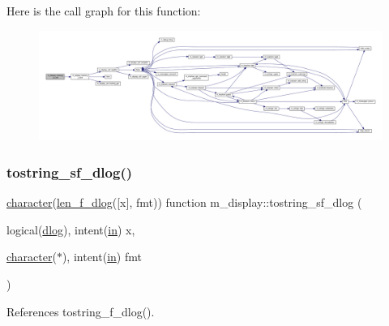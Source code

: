 Here is the call graph for this function\+:
\nopagebreak
\begin{figure}[H]
\begin{center}
\leavevmode
\includegraphics[width=350pt]{namespacem__display_aa7d1fb61fc22bddb9232eaa13aaaa43f_cgraph}
\end{center}
\end{figure}
\mbox{\label{namespacem__display_a833175a75a1f2563fb749394bc577196}} 
\subsubsection{\texorpdfstring{tostring\+\_\+sf\+\_\+dlog()}{tostring\_sf\_dlog()}}
{\footnotesize\ttfamily \hyperlink{option__stopwatch_83_8txt_abd4b21fbbd175834027b5224bfe97e66}{character}(\hyperlink{namespacem__display_a2a298a8f2faf00047152b93cd265d396}{len\+\_\+f\+\_\+dlog}(\mbox{[}x\mbox{]}, fmt)) function m\+\_\+display\+::tostring\+\_\+sf\+\_\+dlog (\begin{DoxyParamCaption}\item[{logical(\hyperlink{namespacem__display_a8c6a3df510feabf6bc84dd0a8789f98c}{dlog}), intent(\hyperlink{M__journal_83_8txt_afce72651d1eed785a2132bee863b2f38}{in})}]{x,  }\item[{\hyperlink{option__stopwatch_83_8txt_abd4b21fbbd175834027b5224bfe97e66}{character}($\ast$), intent(\hyperlink{M__journal_83_8txt_afce72651d1eed785a2132bee863b2f38}{in})}]{fmt }\end{DoxyParamCaption})\hspace{0.3cm}{\ttfamily [private]}}



References tostring\+\_\+f\+\_\+dlog().

